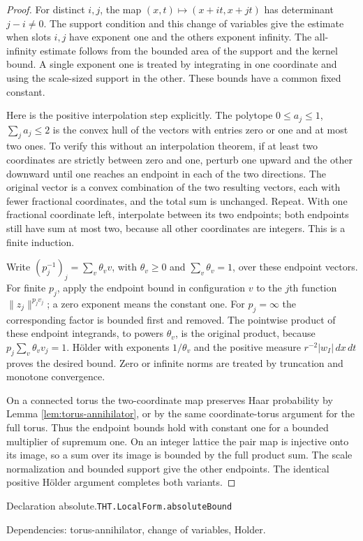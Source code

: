 \documentclass[11pt]{article}
\theoremstyle{definition}
\numberwithin{equation}{section}
\newcommand{\bp}[3]{\par\smallskip\begingroup\footnotesize
\noindent\hypertarget{bp:#1}{\textsf{Declaration #1.}}\quad\nolinkurl{#2}\par
\noindent\textsf{Dependencies:} #3.\par\endgroup\smallskip}
\begin{document}
\begin{proof}
For distinct $i,j$, the map $(x,t)\mapsto(x+it,x+jt)$ has determinant $j-i\ne0$. The support condition and this change of variables give the estimate when slots $i,j$ have exponent one and the others exponent infinity. The all-infinity estimate follows from the bounded area of the support and the kernel bound. A single exponent one is treated by integrating in one coordinate and using the scale-sized support in the other. These bounds have a common fixed constant.

Here is the positive interpolation step explicitly. The polytope $0\le a_j\le1$, $\sum_ja_j\le2$ is the convex hull of the vectors with entries zero or one and at most two ones. To verify this without an interpolation theorem, if at least two coordinates are strictly between zero and one, perturb one upward and the other downward until one reaches an endpoint in each of the two directions. The original vector is a convex combination of the two resulting vectors, each with fewer fractional coordinates, and the total sum is unchanged. Repeat. With one fractional coordinate left, interpolate between its two endpoints; both endpoints still have sum at most two, because all other coordinates are integers. This is a finite induction.

Write $(p_j^{-1})_j=\sum_v\theta_v v$, with $\theta_v\ge0$ and $\sum_v\theta_v=1$, over these endpoint vectors. For finite $p_j$, apply the endpoint bound in configuration $v$ to the $j$th function $\|z_j\|^{p_jv_j}$; a zero exponent means the constant one. For $p_j=\infty$ the corresponding factor is bounded first and removed. The pointwise product of these endpoint integrands, to powers $\theta_v$, is the original product, because $p_j\sum_v\theta_vv_j=1$. H\"older with exponents $1/\theta_v$ and the positive measure $r^{-2}|w_I|\,dx\,dt$ proves the desired bound. Zero or infinite norms are treated by truncation and monotone convergence.

On a connected torus the two-coordinate map preserves Haar probability by Lemma \ref{lem:torus-annihilator}, or by the same coordinate-torus argument for the full torus. Thus the endpoint bounds hold with constant one for a bounded multiplier of supremum one. On an integer lattice the pair map is injective onto its image, so a sum over its image is bounded by the full product sum. The scale normalization and bounded support give the other endpoints. The identical positive H\"older argument completes both variants.
\end{proof}
\bp{absolute}{THT.LocalForm.absoluteBound}{torus-annihilator, change of variables, Holder}
\end{document}
